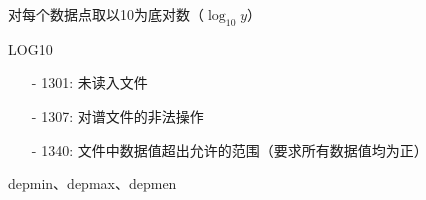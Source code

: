 \label{cmd:log10}

对每个数据点取以10为底对数（$\log_{10} y$）

\begin{SACSTX}
LOG10
\end{SACSTX}

\begin{itemize}
\item[-]1301: 未读入文件
\item[-]1307: 对谱文件的非法操作
\item[-]1340: 文件中数据值超出允许的范围（要求所有数据值均为正）
\end{itemize}

depmin、depmax、depmen
